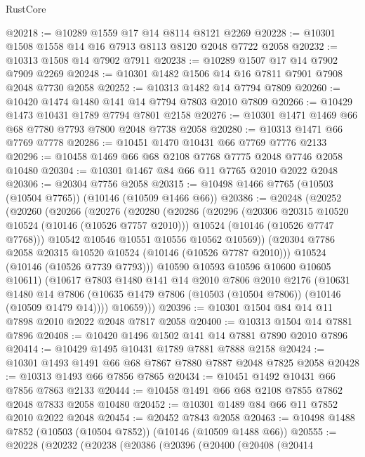 \begin{lexlean}{RustCore}
\begin{coremodule}
@20218 := @10289 @1559 @17 @14 @8114 @8121 @2269
@20228 := @10301 @1508 @1558 @14 @16 @7913 @8113 @8120 @2048 @7722 @2058
@20232 := @10313 @1508 @14 @7902 @7911
@20238 := @10289 @1507 @17 @14 @7902 @7909 @2269
@20248 := @10301 @1482 @1506 @14 @16 @7811 @7901 @7908 @2048 @7730 @2058
@20252 := @10313 @1482 @14 @7794 @7809
@20260 := @10420 @1474 @1480 @141 @14 @7794 @7803 @2010 @7809
@20266 := @10429 @1473 @10431 @1789 @7794 @7801 @2158
@20276 := @10301 @1471 @1469 @66 @68 @7780 @7793 @7800 @2048 @7738 @2058
@20280 := @10313 @1471 @66 @7769 @7778
@20286 := @10451 @1470 @10431 @66 @7769 @7776 @2133
@20296 := @10458 @1469 @66 @68 @2108 @7768 @7775 @2048 @7746 @2058 @10480
@20304 := @10301 @1467 @84 @66 @11 @7765 @2010 @2022 @2048
@20306 := @20304 @7756 @2058
@20315 := @10498 @1466 @7765 (@10503 (@10504 @7765)) (@10146 (@10509 @1466 @66))
@20386 := @20248
    (@20252
      (@20260
        (@20266
          (@20276
            (@20280
              (@20286
                (@20296
                  (@20306 @20315 @10520 @10524 (@10146 (@10526 @7757 @2010)))
                  @10524
                  (@10146 (@10526 @7747 @7768)))
                @10542
                @10546
                @10551
                @10556
                @10562
                @10569))
            (@20304 @7786 @2058 @20315 @10520 @10524 (@10146 (@10526 @7787 @2010)))
            @10524
            (@10146 (@10526 @7739 @7793)))
          @10590
          @10593
          @10596
          @10600
          @10605
          @10611)
        (@10617
          @7803
          @1480
          @141
          @14
          @2010
          @7806
          @2010
          @2176
          (@10631
            @1480
            @14
            @7806
            (@10635 @1479 @7806 (@10503 (@10504 @7806)) (@10146 (@10509 @1479 @14))))
          @10659)))
@20396 := @10301 @1504 @84 @14 @11 @7898 @2010 @2022 @2048 @7817 @2058
@20400 := @10313 @1504 @14 @7881 @7896
@20408 := @10420 @1496 @1502 @141 @14 @7881 @7890 @2010 @7896
@20414 := @10429 @1495 @10431 @1789 @7881 @7888 @2158
@20424 := @10301 @1493 @1491 @66 @68 @7867 @7880 @7887 @2048 @7825 @2058
@20428 := @10313 @1493 @66 @7856 @7865
@20434 := @10451 @1492 @10431 @66 @7856 @7863 @2133
@20444 := @10458 @1491 @66 @68 @2108 @7855 @7862 @2048 @7833 @2058 @10480
@20452 := @10301 @1489 @84 @66 @11 @7852 @2010 @2022 @2048
@20454 := @20452 @7843 @2058
@20463 := @10498 @1488 @7852 (@10503 (@10504 @7852)) (@10146 (@10509 @1488 @66))
@20555 := @20228
    (@20232
      (@20238
        (@20386
          (@20396
            (@20400
              (@20408
                (@20414

\end{coremodule}
\end{lexlean}
